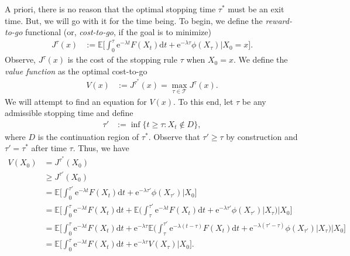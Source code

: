 \documentclass[12pt]{book}
\let\varphi\phi
\numberwithin{equation}{chapter}
\theoremstyle{plain}
\numberwithin{theorem}{section}
\theoremstyle{definition}
\numberwithin{exercise}{chapter}
\newcommand{\<}{\langle}
\renewcommand{\>}{\rangle}
\renewcommand{\(}{\left(}
\renewcommand{\)}{\right)}
\renewcommand{\[}{\left[}
\renewcommand{\]}{\right]}
\newcommand\Eb{\mathds{E}}
\newcommand\Rb{\mathds{R}}
\newcommand\Tc{\mathscr{T}}
\newcommand\lam{\lambda}
\newcommand\dd{\mathrm{d}}
\newcommand\ee{\mathrm{e}}
\begin{document}
\noindent
A priori, there is no reason that the optimal stopping time $\tau^*$ must be an exit time.  But, we will go with it for the time being.  To begin, we define the \emph{reward-to-go} functional (or, \emph{cost-to-go}, if the goal is to minimize)
\begin{align}
J^\tau(x)
	&:=	\Eb \Big[ \int_0^\tau \ee^{-\lam t} F(X_t) \dd t + \ee^{-\lam \tau} \varphi(X_\tau) \Big| X_0 = x \Big] .
\end{align}
Observe, $J^\tau(x)$ is the cost of the stopping rule $\tau$ when $X_0 = x$.  
We define the \emph{value function} as the optimal cost-to-go
\begin{align}
V(x)
	&:=	J^{\tau^*}(x) = \max_{\tau \in \Tc} J^{\tau}(x) .
\end{align}
We will attempt to find an equation for $V(x)$.  To this end, let $\tau$ be any admissible stopping time and define
\begin{align}
\tau'
	&:=	\inf\{ t \geq \tau : X_t \notin D \} ,
\end{align}
where $D$ is the continuation region of $\tau^*$.  
Observe that $\tau' \geq \tau$ by construction and $\tau' = \tau^*$ after time $\tau$.  Thus, we have
%
\begin{align}
V(X_0)
	&=	J^{\tau^*}(X_0) \\
	&\geq J^{\tau'}(X_0) \\
	&=	\Eb \Big[ \int_0^{\tau'} \ee^{-\lam t} F(X_t) \dd t + \ee^{-\lam \tau'}\varphi(X_{\tau'}) \Big| X_0 \Big] \\
	&=	\Eb \Big[ \int_0^\tau \ee^{-\lam t} F(X_t) \dd t 
			+ \Eb \Big( \int_\tau^{\tau'} \ee^{-\lam t} F(X_t) \dd t + \ee^{-\lam \tau'} \varphi(X_{\tau'})\Big| X_\tau \Big) \Big| X_0 \Big] \\
	&=	\Eb \Big[ \int_0^\tau \ee^{-\lam t} F(X_t) \dd t 
			+ \ee^{- \lam \tau }\Eb \Big( \int_\tau^{\tau'} \ee^{-\lam (t-\tau)} F(X_t) \dd t + \ee^{ -\lam (\tau' - \tau) }\varphi(X_{\tau'})\Big| X_\tau \Big) \Big| X_0 \Big] \\
	&=	\Eb \Big[ \int_0^\tau \ee^{-\lam t} F(X_t) \dd t + \ee^{- \lam \tau } V(X_\tau ) \Big| X_0 \Big] . \label{eq:series.of.equations}
\end{align}
\end{document}
